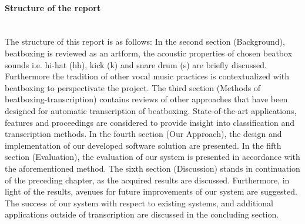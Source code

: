 \paragraph{Structure of the report}\hspace{0pt}\\
The structure of this report is as follows: In the second section (Background), beatboxing is reviewed as an artform, the acoustic properties of chosen beatbox sounds i.e. hi-hat (hh), kick (k) and snare drum (s) are briefly discussed. Furthermore the tradition of other vocal music practices is contextualized with beatboxing to perspectivate the project. The third section (Methods of beatboxing-transcription) contains reviews of other approaches that have been designed for automatic transcription of beatboxing. State-of-the-art applications, features and proceedings are considered to provide insight into classification and transcription methods. In the fourth section (Our Approach), the design and implementation of our developed software solution are presented. In the fifth section (Evaluation), the evaluation of our system is presented in accordance with the aforementioned method. The sixth section (Discussion) stands in continuation of the preceding chapter, as the acquired results are discussed. Furthermore, in light of the results, avenues for future improvements of our system are suggested. The success of our system with respect to existing systems, and additional applications outside of transcription are discussed in the concluding section.